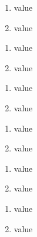 \documentclass{book}
\renewcommand{\_}{\Texinfounderscore\discretionary{}{}{}}
\begin{document}
\begin{enumerate}[label=\alph*.]
\item value
\item value
\end{enumerate}

\begin{enumerate}[label=\Alph*.]
\item value
\item value
\end{enumerate}

\begin{enumerate}[label=\alph*.,start=3]
\item value
\item value
\end{enumerate}

\begin{enumerate}[label=\Alph*.,start=3]
\item value
\item value
\end{enumerate}

\begin{enumerate}[start=1]
\item value
\item value
\end{enumerate}

\begin{enumerate}[start=3]
\item value
\item value
\end{enumerate}
\end{document}
